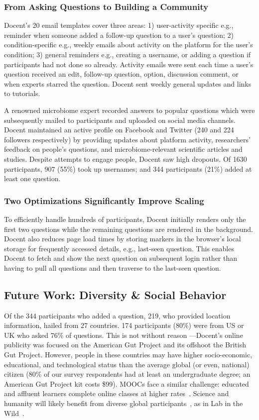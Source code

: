 \subsubsection{From Asking Questions to Building a Community}
Docent’s 20 email templates cover three areas: 1) user-activity specific e.g., reminder when someone added a follow-up question to a user’s question; 2) condition-specific e.g., weekly emails about activity on the platform for the user’s condition; 3) general reminders e.g., creating a username, or adding a question if participants had not done so already. Activity emails were sent each time a user’s question received an edit, follow-up question, option, discussion comment, or when experts starred the question. Docent sent weekly general updates and links to tutorials.
 
A renowned microbiome expert recorded answers to popular questions which were subsequently mailed to participants and uploaded on social media channels. Docent maintained an active profile on Facebook and Twitter (240 and 224 followers respectively) by providing updates about platform activity, researchers’ feedback on people’s questions, and microbiome-relevant scientific articles and studies. Despite attempts to engage people, Docent saw high dropouts. Of 1630 participants, 907 (55\%) took up usernames; and 344 participants (21\%) added at least one question.

\subsubsection{Two Optimizations Significantly Improve Scaling}
To efficiently handle hundreds of participants, Docent initially renders only the first two questions while the remaining questions are rendered in the background. Docent also reduces page load times by storing markers in the browser’s local storage for frequently accessed details, e.g., last-seen question. This enables Docent to fetch and show the next question on subsequent login rather than having to pull all questions and then traverse to the last-seen question. 

\subsection{Future Work: Diversity \& Social Behavior}
Of the 344 participants who added a question, 219, who provided location information, hailed from 27 countries. 174 participants (80\%) were from US or UK who asked 76\% of questions. This is not without reason —Docent’s online publicity was focused on the American Gut Project and its offshoot the British Gut Project. However, people in these countries may have higher socio-economic, educational, and technological status than the average global (or even, national) citizen (80\% of our survey respondents had at least an undergraduate degree; an American Gut Project kit costs \$99). MOOCs face a similar challenge: educated and affluent learners complete online classes at higher rates~\cite{Kizilcec2017b}. Science and humanity will likely benefit from diverse global participants~\cite{Henrich2010a}, as in Lab in the Wild~\cite{Reinecke2015}.

